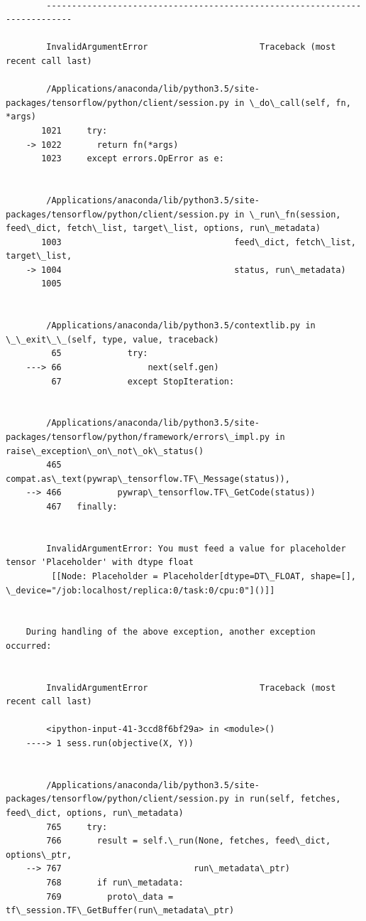 \documentclass[11pt]{article}
\begin{document}
    \begin{Verbatim}[commandchars=\\\{\}]

        ---------------------------------------------------------------------------

        InvalidArgumentError                      Traceback (most recent call last)

        /Applications/anaconda/lib/python3.5/site-packages/tensorflow/python/client/session.py in \_do\_call(self, fn, *args)
       1021     try:
    -> 1022       return fn(*args)
       1023     except errors.OpError as e:


        /Applications/anaconda/lib/python3.5/site-packages/tensorflow/python/client/session.py in \_run\_fn(session, feed\_dict, fetch\_list, target\_list, options, run\_metadata)
       1003                                  feed\_dict, fetch\_list, target\_list,
    -> 1004                                  status, run\_metadata)
       1005 


        /Applications/anaconda/lib/python3.5/contextlib.py in \_\_exit\_\_(self, type, value, traceback)
         65             try:
    ---> 66                 next(self.gen)
         67             except StopIteration:


        /Applications/anaconda/lib/python3.5/site-packages/tensorflow/python/framework/errors\_impl.py in raise\_exception\_on\_not\_ok\_status()
        465           compat.as\_text(pywrap\_tensorflow.TF\_Message(status)),
    --> 466           pywrap\_tensorflow.TF\_GetCode(status))
        467   finally:


        InvalidArgumentError: You must feed a value for placeholder tensor 'Placeholder' with dtype float
    	 [[Node: Placeholder = Placeholder[dtype=DT\_FLOAT, shape=[], \_device="/job:localhost/replica:0/task:0/cpu:0"]()]]

        
    During handling of the above exception, another exception occurred:


        InvalidArgumentError                      Traceback (most recent call last)

        <ipython-input-41-3ccd8f6bf29a> in <module>()
    ----> 1 sess.run(objective(X, Y))
    

        /Applications/anaconda/lib/python3.5/site-packages/tensorflow/python/client/session.py in run(self, fetches, feed\_dict, options, run\_metadata)
        765     try:
        766       result = self.\_run(None, fetches, feed\_dict, options\_ptr,
    --> 767                          run\_metadata\_ptr)
        768       if run\_metadata:
        769         proto\_data = tf\_session.TF\_GetBuffer(run\_metadata\_ptr)



\end{Verbatim}
\end{document}
